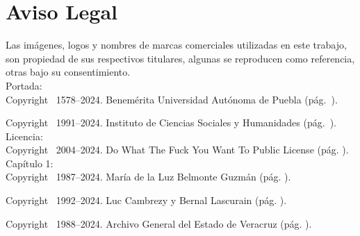 \documentclass[14pt,twoside,final]{extbook} %
\begin{document}
\chapter{Aviso Legal}
\label{ap:aviso-legal}
\thispagestyle{empty}
\pagestyle{fancy}
\fancyhf{} %
\fancyhead[RO,LE]{\thepage}
\renewcommand{\headrulewidth}{0pt}
\renewcommand{\TeX}{T\kern -.1267em\lower .35ex\hbox {E}\kern -.105emX} %
\renewcommand{\LaTeX}{L\kern-.275em\raisebox{.5ex}{\textsc{a}}\kern-.1em\hbox{\TeX}} %
\renewcommand{\LaTeXe}{L\kern-.275em\raisebox{.5ex}{\textsc{a}}\kern-.1em\hbox{\TeX} \hbox{2}\kern-.03em\raisebox{-.4ex}{\fontencoding{LGR}\selectfont\char 101}} %
Las imágenes, logos y nombres de marcas comerciales utilizadas en este trabajo, son propiedad de sus respectivos titulares, algunas se reproducen como referencia, otras bajo su consentimiento. \\

\noindent Portada: \\

\noindent Copyright \textcopyright\ 1578--2024. Benemérita Universidad Autónoma de Puebla (pág.~\pageref{fig:buap}).

\noindent Copyright \textcopyright\ 1991--2024. Instituto de Ciencias Sociales y Humanidades (pág.~\pageref{fig:icsyh}). \\

\noindent Licencia: \\

\noindent Copyright \textcopyright\ 2004--2024. Do What The Fuck You Want To Public License (pág. \pageref{fig:wtfpl}). \\

\noindent Capítulo 1: \\

\noindent Copyright \textcopyright\ 1987--2024. María de la Luz Belmonte Guzmán (pág. \pageref{fig:veracruz-1857}).

\noindent Copyright \textcopyright\ 1992--2024. Luc Cambrezy y Bernal Lascurain (pág. \pageref{fig:jalacingo-principios-xx}).

\noindent Copyright \textcopyright\ 1988--2024. Archivo General del Estado de Veracruz (pág. \pageref{fig:progreso-industrial}). \\
\end{document}
